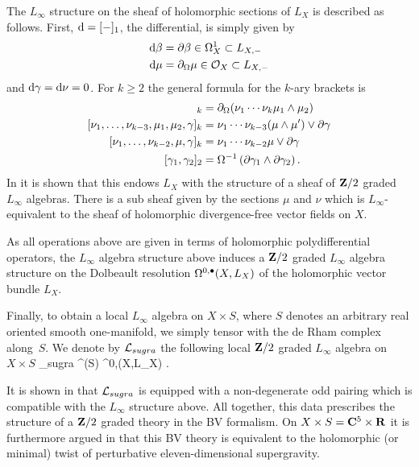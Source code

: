 \documentclass[11pt]{amsart}%
\begin{document}
The $L_\infty$ structure on the sheaf of holomorphic sections of $L_X$ is described as follows. 
First, ${\rm d} = [-]_1$, the differential, is simply given by 
\begin{align*}
{\rm d} \beta & = \partial \beta \in \Omega^1_X \subset L_{X,-} \\
{\rm d} \mu & = \partial_{\Omega} \mu \in \mathcal O_X \subset L_{X, -}
\end{align*}
and ${\rm d} \gamma = {\rm d} \nu = 0$. 
For $k \geq 2$ the general formula for the $k$-ary brackets is 
\begin{align*}
[\nu_1, \ldots, \nu_{k-2}, \mu_1,\mu_2]_{k} & = \div(\nu_1 \cdots \nu_k \mu_1 \wedge \mu_2) \\
[\nu_1,\ldots, \nu_{k-3}, \mu_1,\mu_2,\gamma]_k & = \nu_1 \cdots \nu_{k-3} (\mu \wedge \mu') \vee \del \gamma \\
[\nu_1,\ldots,\nu_{k-2}, \mu, \gamma]_k & = \nu_1 \cdots \nu_{k-2} \mu \vee \del \gamma \\
[\gamma_1,\gamma_2]_2 & = \Omega^{-1} \left(\del \gamma_1 \wedge \del \gamma_2 \right) .
\end{align*}
In \cite{RSW} it is shown that this endows $L_{X}$ with the structure of a sheaf of $\mathbf{Z}/2$ graded $L_\infty$ algebras.
There is a sub sheaf given by the sections $\mu$ and $\nu$ which is $L_\infty$-equivalent to the sheaf of holomorphic divergence-free vector fields on $X$. 

As all operations above are given in terms of holomorphic polydifferential operators, the $L_\infty$ algebra structure above induces a $\mathbf{Z}/2$ graded $L_\infty$ algebra structure on the Dolbeault resolution $\Omega^{0,\bullet}(X,L_X)$ of the holomorphic vector bundle $L_X$.

Finally, to obtain a local $L_\infty$ algebra on $X \times S$, where $S$ denotes an arbitrary real oriented smooth one-manifold, we simply tensor with the de Rham complex along~$S$.
We denote by $\mathcal L_{sugra}$ the following local $\mathbf{Z}/2$ graded $L_\infty$ algebra on $X \times S$
\beqn
\cL_{sugra}  \Omega^\bu(S) \hotimes \Omega^{0,\bu}(X,L_X) .
\eeqn

\parsec[s:rsw]
It is shown in \cite{RSW} that $\mathcal L_{sugra}$ is equipped with a non-degenerate odd pairing which is compatible with the $L_\infty$ structure above. 
All together, this data prescribes the structure of a $\mathbf{Z}/2$ graded theory in the BV formalism. 
On $X \times S = \mathbf{C}^5 \times \mathbf{R}$ it is furthermore argued in \cite{RSW} that this BV theory is equivalent to the holomorphic (or minimal) twist of perturbative eleven-dimensional supergravity. 
\end{document}
